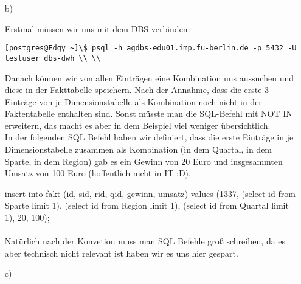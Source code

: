\begin{enumerate}
\item[b)]

Erstmal müssen wir uns mit dem DBS verbinden: \\
\begin{lstlisting}[style=bash]
[postgres@Edgy ~]\$ psql -h agdbs-edu01.imp.fu-berlin.de -p 5432 -U testuser dbs-dwh \\ \\
\end{lstlisting}

Danach können wir von allen Einträgen eine Kombination uns aussuchen und diese in der Fakttabelle speichern. Nach der Annahme, dass die erste 3 Einträge von je Dimensionstabelle als Kombination noch nicht in der Faktentabelle enthalten sind. Sonst müsste man die SQL-Befehl mit NOT IN erweitern, das macht es aber in dem Beispiel viel weniger übersichtlich. \\

In der folgenden SQL Befehl haben wir definiert, dass die erste Einträge in je Dimensionstabelle zusammen als Kombination (in dem Quartal, in dem Sparte, in dem Region) gab es ein Gewinn von 20 Euro und insgesammten Umsatz von 100 Euro (hoffentlich nicht in IT :D).

insert into fakt (id, sid, rid, qid, gewinn, umsatz) values (1337, (select id from Sparte limit 1), (select id from Region limit 1), (select id from Quartal limit 1), 20, 100); \\ \\

Natürlich nach der Konvetion muss man SQL Befehle groß schreiben, da es aber technisch nicht relevant ist haben wir es uns hier gespart.

\item[c)]

\end{enumerate}


